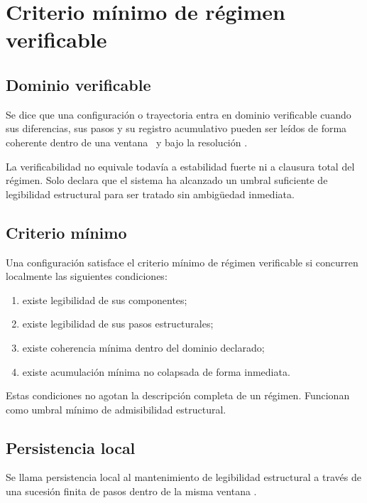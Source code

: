 \chapter{Criterio mínimo de régimen verificable}

\section{Dominio verificable}
\begin{definition}
Se dice que una configuración o trayectoria entra en dominio verificable cuando sus diferencias, sus pasos y su registro acumulativo pueden ser leídos de forma coherente dentro de una ventana \Win\ y bajo la resolución \eps.
\end{definition}

\begin{observation}
La verificabilidad no equivale todavía a estabilidad fuerte ni a clausura total del régimen. Solo declara que el sistema ha alcanzado un umbral suficiente de legibilidad estructural para ser tratado sin ambigüedad inmediata.
\end{observation}

\section{Criterio mínimo}
\begin{definition}
Una configuración satisface el criterio mínimo de régimen verificable si concurren localmente las siguientes condiciones:
\begin{enumerate}
  \item existe legibilidad de sus componentes;
  \item existe legibilidad de sus pasos estructurales;
  \item existe coherencia mínima dentro del dominio declarado;
  \item existe acumulación mínima no colapsada de forma inmediata.
\end{enumerate}
\end{definition}

\begin{observation}
Estas condiciones no agotan la descripción completa de un régimen. Funcionan como umbral mínimo de admisibilidad estructural.
\end{observation}

\section{Persistencia local}
\begin{definition}
Se llama persistencia local al mantenimiento de legibilidad estructural a través de una sucesión finita de pasos dentro de la misma ventana \Win.
\end{definition}

